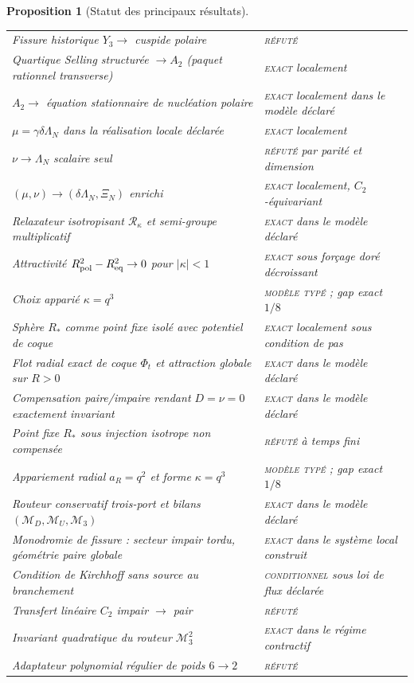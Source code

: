 \documentclass[11pt,a4paper]{article}
\newtheorem{proposition}[theorem]{Proposition}
\newcommand{\statusExact}{\textsc{exact}}
\newcommand{\statusCond}{\textsc{conditionnel}}
\newcommand{\statusTyped}{\textsc{modèle typé}}
\begin{document}
\begin{proposition}[Statut des principaux résultats]
\begin{longtable}{@{}p{}p{}@{}}
Fissure historique $Y_3\to$ cuspide polaire & \textsc{réfuté}\\
Quartique Selling structurée $\to A_2$ (paquet rationnel transverse) & \statusExact{} localement\\
$A_2\to$ équation stationnaire de nucléation polaire & \statusExact{} localement dans le modèle déclaré\\
$\mu=\gamma\delta\Lambda_N$ dans la réalisation locale déclarée & \statusExact{} localement\\
$\nu\to\Lambda_N$ scalaire seul & \textsc{réfuté} par parité et dimension\\
$(\mu,\nu)\to(\delta\Lambda_N,\Xi_N)$ enrichi & \statusExact{} localement, $C_2$-équivariant\\
Relaxateur isotropisant $\mathcal R_\kappa$ et semi-groupe multiplicatif & \statusExact{} dans le modèle déclaré\\
Attractivité $R_{\rm pol}^2-R_{\rm eq}^2\to0$ pour $|\kappa|<1$ & \statusExact{} sous forçage doré décroissant\\
Choix apparié $\kappa=q^3$ & \statusTyped{} ; gap exact $1/8$\\
Sphère $R_*$ comme point fixe isolé avec potentiel de coque & \statusExact{} localement sous condition de pas\\
Flot radial exact de coque $\Phi_t$ et attraction globale sur $R>0$ & \statusExact{} dans le modèle déclaré\\
Compensation paire/impaire rendant $D=\nu=0$ exactement invariant & \statusExact{} dans le modèle déclaré\\
Point fixe $R_*$ sous injection isotrope non compensée & \textsc{réfuté} à temps fini\\
Appariement radial $a_R=q^2$ et forme $\kappa=q^3$ & \statusTyped{} ; gap exact $1/8$\\
Routeur conservatif trois-port et bilans $(\mathcal M_D,\mathcal M_U,\mathcal M_3)$ & \statusExact{} dans le modèle déclaré\\
Monodromie de fissure : secteur impair tordu, géométrie paire globale & \statusExact{} dans le système local construit\\
Condition de Kirchhoff sans source au branchement & \statusCond{} sous loi de flux déclarée\\
Transfert linéaire $C_2$ impair $\to$ pair & \textsc{réfuté}\\
Invariant quadratique du routeur $\mathcal M_3^2$ & \statusExact{} dans le régime contractif\\
Adaptateur polynomial régulier de poids $6\to2$ & \textsc{réfuté}\\

\end{longtable}
\end{proposition}
\end{document}
